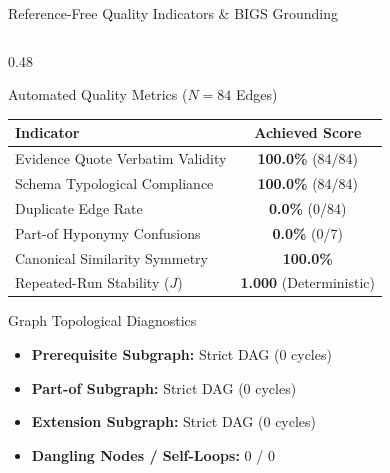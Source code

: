 \documentclass[aspectratio=169,10pt]{beamer}
\begin{document}
\begin{frame}{Reference-Free Quality Indicators \& BIGS Grounding}
    \begin{columns}[T]
        \begin{column}{0.48\textwidth}
            \begin{block}{Automated Quality Metrics ($N=84$ Edges)}
                \footnotesize
                \begin{tabular}{lc}
                    \toprule
                    \textbf{Indicator} & \textbf{Achieved Score} \\
                    \midrule
                    Evidence Quote Verbatim Validity & \textbf{100.0\%} (84/84) \\
                    Schema Typological Compliance & \textbf{100.0\%} (84/84) \\
                    Duplicate Edge Rate & \textbf{0.0\%} (0/84) \\
                    Part-of Hyponymy Confusions & \textbf{0.0\%} (0/7) \\
                    Canonical Similarity Symmetry & \textbf{100.0\%} \\
                    Repeated-Run Stability ($J$) & \textbf{1.000} (Deterministic) \\
                    \bottomrule
                \end{tabular}
            \end{block}

            \begin{block}{Graph Topological Diagnostics}
                \footnotesize
                \begin{itemize}
                    \item \textbf{Prerequisite Subgraph:} Strict DAG (0 cycles)
                    \item \textbf{Part-of Subgraph:} Strict DAG (0 cycles)
                    \item \textbf{Extension Subgraph:} Strict DAG (0 cycles)
                    \item \textbf{Dangling Nodes / Self-Loops:} 0 / 0
                \end{itemize}
            \end{block}
        \end{column}


\end{columns}
\end{frame}
\end{document}
